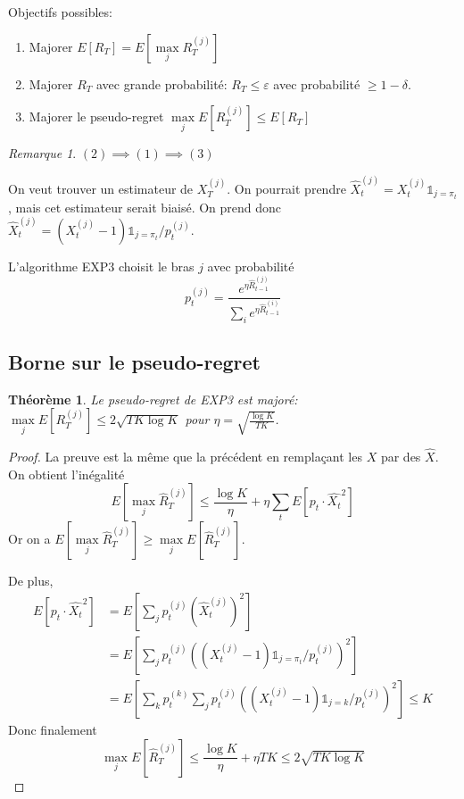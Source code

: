 \documentclass{article}
\newtheorem{theorem}{Théorème}[section]
\theoremstyle{remark}
\theoremstyle{remark}
\newtheorem{remark}{Remarque}[section]
\begin{document}
Objectifs possibles:
\begin{enumerate}
    \item
    Majorer $E[R_T]= E[\max\limits_j R_T^{(j)}]$
    \item
    Majorer $R_T$ avec grande probabilité: $R_T\le \varepsilon$ avec probabilité $\ge 1-\delta$.
    \item
    Majorer le pseudo-regret $\max\limits_j E[R_T^{(j)}]\le E[R_T]$
\end{enumerate}

\begin{remark}
$(2) \implies (1) \implies (3)$
\end{remark}

On veut trouver un estimateur de $X_T^{(j)}$. On pourrait prendre $\hat{X}_t^{(j)}=X_t^{(j)}\mathbb{1}_{j=\pi_t}$, mais cet estimateur serait biaisé. On prend donc $\hat{X}_t^{(j)}=(X_t^{(j)}-1)\mathbb{1}_{j=\pi_t}/p_t^{(j)}$.

L'algorithme EXP3 choisit le bras $j$ avec probabilité
\begin{equation*}
    p_t^{(j)} = \frac{e^{\eta \hat{R}_{t-1}^{(j)}}}{\sum\limits_i e^{\eta \hat{R}_{t-1}^{(i)}}}
\end{equation*}

\subsection{Borne sur le pseudo-regret}
\begin{theorem}
Le pseudo-regret de EXP3 est majoré:
$\max\limits_j E[R_T^{(j)}]\le 2\sqrt{TK\log{K}}$ pour $\eta=\sqrt{\frac{\log{K}}{TK}}$.
\end{theorem}

\begin{proof}
La preuve est la même que la précédent en remplaçant les $X$ par des $\hat{X}$. On obtient l'inégalité
\begin{equation*}
    E[\max\limits_j \hat{R}_T^{(j)}]\le \frac{\log{K}}{\eta}+\eta\sum\limits_t E[p_t\cdot\hat{X_t}^2]
\end{equation*}
Or on a $E[\max\limits_j \hat{R}_T^{(j)}]\ge \max\limits_j E[\hat{R}_T^{(j)}]$.

De plus,
\begin{equation*}
    \begin{aligned}
    E[p_t\cdot\hat{X_t}^2] & =E[\sum\limits_j p_t^{(j)}(\hat{X}_t^{(j)})^2]\\
    & =E[\sum\limits_j p_t^{(j)}\left((X_t^{(j)}-1)\mathbb{1}_{j=\pi_t}/p_t^{(j)}\right)^2]\\
    & =E[\sum\limits_k p_t^{(k)}\sum\limits_j p_t^{(j)}\left((X_t^{(j)}-1)\mathbb{1}_{j=k}/p_t^{(j)}\right)^2]\le K
    \end{aligned}
\end{equation*}
Donc finalement
\begin{equation*}
    \max\limits_j E[\hat{R}_T^{(j)}]\le \frac{\log{K}}{\eta}+\eta T K\le  2\sqrt{TK\log{K}}
\end{equation*}
\end{proof}
\end{document}
